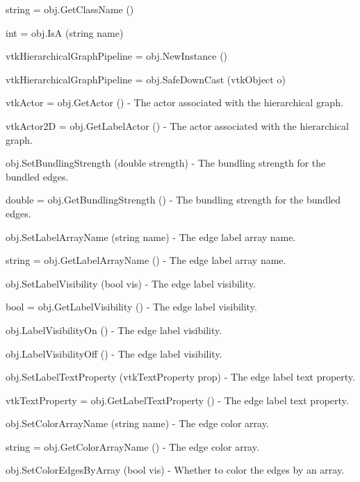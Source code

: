 \begin{DoxyItemize}
\item {\ttfamily string = obj.\-Get\-Class\-Name ()}  
\item {\ttfamily int = obj.\-Is\-A (string name)}  
\item {\ttfamily vtk\-Hierarchical\-Graph\-Pipeline = obj.\-New\-Instance ()}  
\item {\ttfamily vtk\-Hierarchical\-Graph\-Pipeline = obj.\-Safe\-Down\-Cast (vtk\-Object o)}  
\item {\ttfamily vtk\-Actor = obj.\-Get\-Actor ()} -\/ The actor associated with the hierarchical graph.  
\item {\ttfamily vtk\-Actor2\-D = obj.\-Get\-Label\-Actor ()} -\/ The actor associated with the hierarchical graph.  
\item {\ttfamily obj.\-Set\-Bundling\-Strength (double strength)} -\/ The bundling strength for the bundled edges.  
\item {\ttfamily double = obj.\-Get\-Bundling\-Strength ()} -\/ The bundling strength for the bundled edges.  
\item {\ttfamily obj.\-Set\-Label\-Array\-Name (string name)} -\/ The edge label array name.  
\item {\ttfamily string = obj.\-Get\-Label\-Array\-Name ()} -\/ The edge label array name.  
\item {\ttfamily obj.\-Set\-Label\-Visibility (bool vis)} -\/ The edge label visibility.  
\item {\ttfamily bool = obj.\-Get\-Label\-Visibility ()} -\/ The edge label visibility.  
\item {\ttfamily obj.\-Label\-Visibility\-On ()} -\/ The edge label visibility.  
\item {\ttfamily obj.\-Label\-Visibility\-Off ()} -\/ The edge label visibility.  
\item {\ttfamily obj.\-Set\-Label\-Text\-Property (vtk\-Text\-Property prop)} -\/ The edge label text property.  
\item {\ttfamily vtk\-Text\-Property = obj.\-Get\-Label\-Text\-Property ()} -\/ The edge label text property.  
\item {\ttfamily obj.\-Set\-Color\-Array\-Name (string name)} -\/ The edge color array.  
\item {\ttfamily string = obj.\-Get\-Color\-Array\-Name ()} -\/ The edge color array.  
\item {\ttfamily obj.\-Set\-Color\-Edges\-By\-Array (bool vis)} -\/ Whether to color the edges by an array.  

\end{DoxyItemize}
